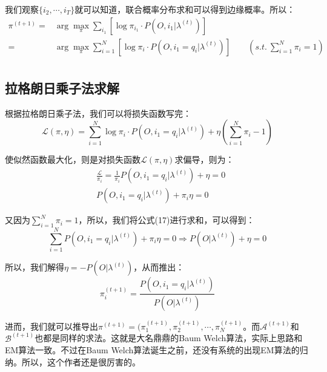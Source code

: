\documentclass[a4paper]{article}
\begin{document}
我们观察$\{i_2,\cdots,i_T\}$就可以知道，联合概率分布求和可以得到边缘概率。所以：
\begin{equation}
    \begin{split}
        \pi^{(t+1)} = & \arg\max_{\pi} \sum_{i_1} [\log \pi_{i_1} \cdot P(O,i_1|\lambda^{(t)})] \\
        = & \arg\max_{\pi} \sum_{i=1}^N [\log \pi_{i} \cdot P(O,i_1=q_i|\lambda^{(t)})] \qquad (s.t. \ \sum_{i=1}^N \pi_i = 1) \\
    \end{split}
\end{equation}

\subsection{拉格朗日乘子法求解}
根据拉格朗日乘子法，我们可以将损失函数写完：
\begin{equation}
    \mathcal{L}(\pi,\eta) = \sum_{i=1}^N \log \pi_{i} \cdot P(O,i_1=q_i|\lambda^{(t)}) + \eta(\sum_{i=1}^N \pi_i - 1)
\end{equation}

使似然函数最大化，则是对损失函数$\mathcal{L}(\pi,\eta)$求偏导，则为：
\begin{align}
    & \frac{\mathcal{L}}{\pi_i} = \frac{1}{\pi_i} P(O,i_1=q_i|\lambda^{(t)}) + \eta = 0 \\
    & P(O,i_1=q_i|\lambda^{(t)}) + \pi_i\eta = 0 
\end{align}

又因为$\sum_{i=1}^N \pi_i = 1$，所以，我们将公式(17)进行求和，可以得到：
\begin{equation}
    \sum_{i=1}^N P(O,i_1=q_i|\lambda^{(t)}) + \pi_i\eta = 0 \Rightarrow P(O|\lambda^{(t)}) + \eta = 0
\end{equation}

所以，我们解得$\eta = -P(O|\lambda^{(t)})$，从而推出：
\begin{equation}
    \pi_i^{(t+1)} = \frac{P(O,i_1=q_i|\lambda^{(t)})}{P(O|\lambda^{(t)})}
\end{equation}

进而，我们就可以推导出$\pi^{(t+1)} = (\pi_1^{(t+1)},\pi_2^{(t+1)},\cdots,\pi_N^{(t+1)}$。而$\mathcal{A}^{(t+1)}$和$\mathcal{B}^{(t+1)}$也都是同样的求法。这就是大名鼎鼎的Baum Welch算法，实际上思路和EM算法一致。不过在Baum Welch算法诞生之前，还没有系统的出现EM算法的归纳。所以，这个作者还是很厉害的。
\end{document}
